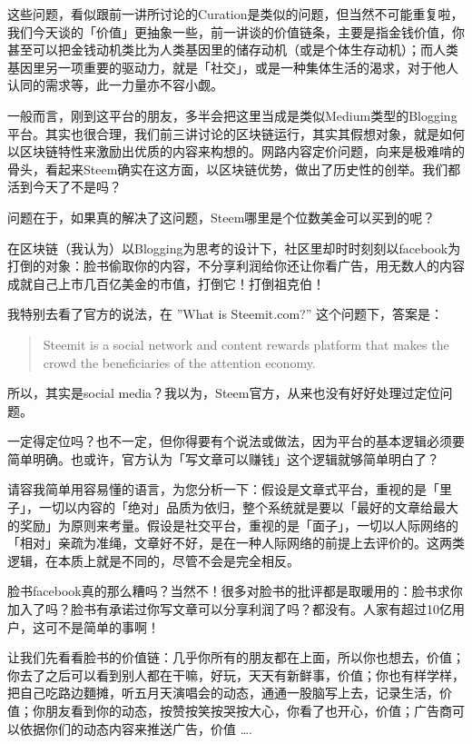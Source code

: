 \documentclass[]{ctexbook}
\begin{document}
这些问题，看似跟前一讲所讨论的Curation是类似的问题，但当然不可能重复啦，我们今天谈的「价值」更抽象一些，前一讲谈的价值链条，主要是指金钱价值，你甚至可以把金钱动机类比为人类基因里的储存动机（或是个体生存动机）；而人类基因里另一项重要的驱动力，就是「社交」，或是一种集体生活的渴求，对于他人认同的需求等，此一力量亦不容小觑。

一般而言，刚到这平台的朋友，多半会把这里当成是类似Medium类型的Blogging平台。其实也很合理，我们前三讲讨论的区块链运行，其实其假想对象，就是如何以区块链特性来激励出优质的内容来构想的。网路内容定价问题，向来是极难啃的骨头，看起来Steem确实在这方面，以区块链优势，做出了历史性的创举。我们都活到今天了不是吗？

问题在于，如果真的解决了这问题，Steem哪里是个位数美金可以买到的呢？

在区块链（我认为）以Blogging为思考的设计下，社区里却时时刻刻以facebook为打倒的对象：脸书偷取你的内容，不分享利润给你还让你看广告，用无数人的内容成就自己上市几百亿美金的市值，打倒它！打倒祖克伯！

我特别去看了官方的说法，在 ''What is Steemit.com?'' 这个问题下，答案是：

\begin{quote}
Steemit is a social network and content rewards platform that makes the crowd the beneficiaries of the attention economy.
\end{quote}

所以，其实是social media？我以为，Steem官方，从来也没有好好处理过定位问题。

一定得定位吗？也不一定，但你得要有个说法或做法，因为平台的基本逻辑必须要简单明确。也或许，官方认为「写文章可以赚钱」这个逻辑就够简单明白了？

请容我简单用容易懂的语言，为您分析一下：假设是文章式平台，重视的是「里子」，一切以内容的「绝对」品质为依归，整个系统就是要以「最好的文章给最大的奖励」为原则来考量。假设是社交平台，重视的是「面子」，一切以人际网络的「相对」亲疏为准绳，文章好不好，是在一种人际网络的前提上去评价的。这两类逻辑，在本质上就是不同的，尽管不会是完全相反。

脸书facebook真的那么糟吗？当然不！很多对脸书的批评都是取暖用的：脸书求你加入了吗？脸书有承诺过你写文章可以分享利润了吗？都没有。人家有超过10亿用户，这可不是简单的事啊！

让我们先看看脸书的价值链：几乎你所有的朋友都在上面，所以你也想去，价值；你去了之后可以看到别人都在干嘛，好玩，天天有新鲜事，价值；你也有样学样，把自己吃路边麵摊，听五月天演唱会的动态，通通一股脑写上去，记录生活，价值；你朋友看到你的动态，按赞按笑按哭按大心，你看了也开心，价值；广告商可以依据你们的动态内容来推送广告，价值 \ldots{}.
\end{document}
